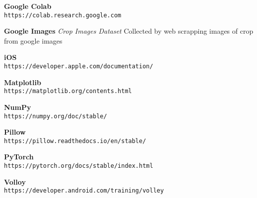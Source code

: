 \documentclass[../Report.tex]{subfiles}
\begin{document}
\begin{thebibliography}{9}
    \textbf{Google Colab}
    \\\texttt{https://colab.research.google.com}

    \textbf{Google Images}
    \textit{Crop Images Dataset} Collected by web scrapping images of crop from google images

    \textbf{iOS}
    \\\texttt{https://developer.apple.com/documentation/}

    \textbf{Matplotlib}
    \\\texttt{https://matplotlib.org/contents.html}

    \textbf{NumPy}
    \\\texttt{https://numpy.org/doc/stable/}

    \textbf{Pillow}
    \\\texttt{https://pillow.readthedocs.io/en/stable/}

    \textbf{PyTorch}
    \\\texttt{https://pytorch.org/docs/stable/index.html}

    \textbf{Volloy}
    \\\texttt{https://developer.android.com/training/volley}


\end{thebibliography}
\end{document}
